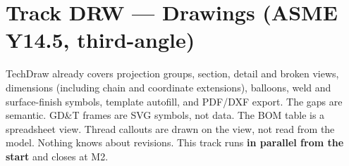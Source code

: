 \section{Track DRW --- Drawings (ASME Y14.5, third-angle)}\label{sec:drw}

TechDraw already covers projection groups, section, detail and broken views, dimensions (including chain
and coordinate extensions), balloons, weld and surface-finish symbols, template autofill, and
PDF/DXF export. The gaps are semantic. GD\&T frames are SVG symbols, not data. The BOM table is a
spreadsheet view. Thread callouts are drawn on the view, not read from the model. Nothing knows about
revisions. This track runs \textbf{in parallel from the start} and closes at M2.

